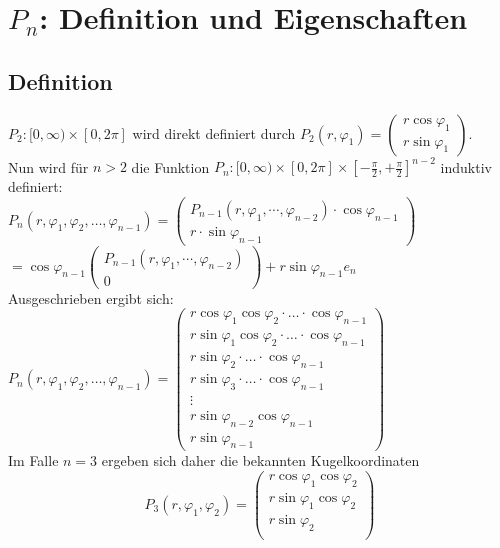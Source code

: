 \documentclass[a4paper,11pt]{scrartcl}
\begin{document}
\section{$P_n$: Definition und Eigenschaften}
\subsection{Definition}
$P_2:[0, \infty)\times [0, 2\pi]$ wird direkt definiert durch $P_2(r,\varphi_1)=\begin{pmatrix}
r\cos\varphi_1\\ r\sin\varphi_1\end{pmatrix}$.\\
Nun wird für $n>2$ die Funktion $P_n:[0,\infty)\times[0, 2\pi]\times[-\frac{\pi}{2},+\frac{\pi}{2}]^{n-2}$ induktiv definiert:\\[0.5em]
$P_n(r,\varphi_1, \varphi_2, \ldots, \varphi_{n-1})=\begin{pmatrix}
P_{n-1}(r,\varphi_1,\cdots,\varphi_{n-2})\cdot\cos\varphi_{n-1} \\ r\cdot\sin \varphi_{n-1}\end{pmatrix}
$ \\ $= \cos\varphi_{n-1}\begin{pmatrix}P_{n-1}(r,\varphi_1,\cdots,\varphi_{n-2}) \\ 0 \end{pmatrix}+r\sin\varphi_{n-1}e_n$\\
Ausgeschrieben ergibt sich:\\
$P_n(r,\varphi_1, \varphi_2, \ldots, \varphi_{n-1})= \begin{pmatrix}r\cos\varphi_1\cos\varphi_2\cdot\ldots\cdot\cos\varphi_{n-1} \\ r\sin\varphi_1\cos\varphi_2\cdot\ldots\cdot\cos\varphi_{n-1} \\
r\sin\varphi_2\cdot\ldots\cdot\cos\varphi_{n-1} \\
r\sin\varphi_3\cdot\ldots\cdot\cos\varphi_{n-1} \\
\vdots \\
r\sin\varphi_{n-2}\cos\varphi_{n-1} \\
r \sin\varphi_{n-1}
\end{pmatrix}$\\
Im Falle $n=3$ ergeben sich daher die bekannten Kugelkoordinaten
$$P_3(r,\varphi_1, \varphi_2)=
\begin{pmatrix}r\cos\varphi_1\cos\varphi_2 \\
r\sin\varphi_1\cos\varphi_2\\
r\sin\varphi_2\\ \end{pmatrix}$$
\end{document}
